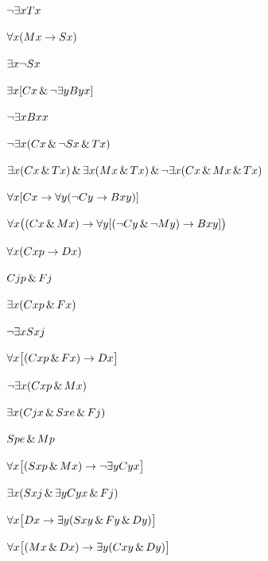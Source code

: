 \begin{earg}
\item %
$\neg\exists x Tx$
\item %
$\forall x(Mx \rightarrow Sx)$
\item %
$\exists x \neg Sx$
\item %
$\exists x[Cx \,\&\, \neg\exists y Byx]$
\item %
$\neg \exists x Bxx$
\item %
$\neg \exists x(Cx \,\&\, \neg Sx \,\&\, Tx)$
\item %
$\exists x(Cx \,\&\, Tx) \,\&\, \exists x(Mx \,\&\, Tx) \,\&\, \neg \exists x(Cx \,\&\, Mx \,\&\, Tx)$
\item %
$\forall x[Cx \rightarrow \forall y(\neg Cy \rightarrow Bxy)]$
\item %
$\forall x\bigl((Cx \,\&\, Mx) \rightarrow \forall y[(\neg Cy \,\&\, \neg My) \rightarrow Bxy]\bigr)$
\end{earg}


\begin{earg}
\item %
$\forall x(Cxp \rightarrow Dx)$
\item %
$Cjp \,\&\, Fj$
\item %
$\exists x(Cxp \,\&\, Fx)$
\item %
$\neg\exists x Sxj$
\item %
$\forall x\bigl[(Cxp \,\&\, Fx)\rightarrow Dx\bigr]$
\item %
$\neg\exists x(Cxp \,\&\, Mx)$
\item %
$\exists x(Cjx \,\&\, Sxe \,\&\, Fj)$
\item %
$Spe \,\&\, Mp$
\item %
$\forall x\bigl[(Sxp \,\&\, Mx) \rightarrow \neg\exists y Cyx\bigr]$
\item %
$\exists x(Sxj \,\&\, \exists y Cyx \,\&\, Fj)$
\item %
$\forall x\bigl[Dx \rightarrow \exists y(Sxy \,\&\, Fy \,\&\, Dy)\bigr]$
\item %
$\forall x\bigl[(Mx \,\&\, Dx) \rightarrow \exists y(Cxy \,\&\, Dy)\bigr]$
\end{earg}

